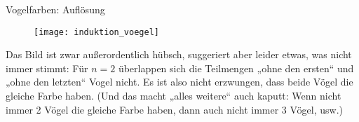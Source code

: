 \begin{frame}{Vogelfarben: Auflösung}
	\begin{figure}
		\texttt{[image: induktion\_voegel]}
		\centering
	\end{figure}
	Das Bild ist zwar außerordentlich hübsch, suggeriert aber leider etwas, was nicht
	immer stimmt: Für $n = 2$ überlappen sich die Teilmengen „ohne den ersten“ und
	„ohne den letzten“ Vogel nicht. Es ist also nicht erzwungen, dass beide Vögel die
	gleiche Farbe haben.
	(Und das macht „alles weitere“ auch kaputt: Wenn nicht immer 2 Vögel die
	gleiche Farbe haben, dann auch nicht immer 3 Vögel, usw.)
\end{frame}